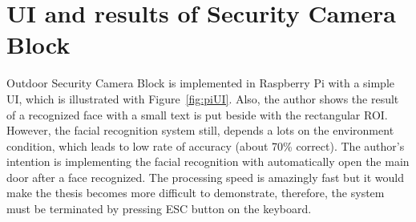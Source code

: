 \section{UI and results of Security Camera Block}
Outdoor Security Camera Block is implemented in Raspberry Pi with a simple UI, which is illustrated with Figure~\ref{fig:piUI}. Also, the author shows the result of a recognized face with a small text is put beside with the rectangular ROI. However, the facial recognition system still, depends a lots on the environment condition, which leads to low rate of accuracy (about 70\% correct). The author’s intention is implementing the facial recognition with automatically open the main door after a face recognized. The processing speed is amazingly fast but it would make the thesis becomes more difficult to demonstrate, therefore, the system must be terminated by pressing ESC button on the keyboard.
